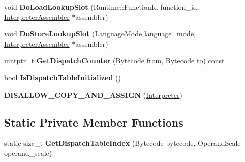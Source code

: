 \begin{DoxyCompactItemize}
\item 
void {\bfseries Do\+Load\+Lookup\+Slot} (Runtime\+::\+Function\+Id function\+\_\+id, \hyperlink{classv8_1_1internal_1_1interpreter_1_1_interpreter_assembler}{Interpreter\+Assembler} $\ast$assembler)\hypertarget{classv8_1_1internal_1_1interpreter_1_1_interpreter_a2507553761cf3a446698a69b08c2d8e2}{}\label{classv8_1_1internal_1_1interpreter_1_1_interpreter_a2507553761cf3a446698a69b08c2d8e2}

\item 
void {\bfseries Do\+Store\+Lookup\+Slot} (Language\+Mode language\+\_\+mode, \hyperlink{classv8_1_1internal_1_1interpreter_1_1_interpreter_assembler}{Interpreter\+Assembler} $\ast$assembler)\hypertarget{classv8_1_1internal_1_1interpreter_1_1_interpreter_af36c8407324e95afa04442dcb1fddff8}{}\label{classv8_1_1internal_1_1interpreter_1_1_interpreter_af36c8407324e95afa04442dcb1fddff8}

\item 
uintptr\+\_\+t {\bfseries Get\+Dispatch\+Counter} (Bytecode from, Bytecode to) const \hypertarget{classv8_1_1internal_1_1interpreter_1_1_interpreter_ab2ae4fb0effb32b50e433229001080d7}{}\label{classv8_1_1internal_1_1interpreter_1_1_interpreter_ab2ae4fb0effb32b50e433229001080d7}

\item 
bool {\bfseries Is\+Dispatch\+Table\+Initialized} ()\hypertarget{classv8_1_1internal_1_1interpreter_1_1_interpreter_af489bf102bafa981f5587f5816f2ec37}{}\label{classv8_1_1internal_1_1interpreter_1_1_interpreter_af489bf102bafa981f5587f5816f2ec37}

\item 
{\bfseries D\+I\+S\+A\+L\+L\+O\+W\+\_\+\+C\+O\+P\+Y\+\_\+\+A\+N\+D\+\_\+\+A\+S\+S\+I\+GN} (\hyperlink{classv8_1_1internal_1_1interpreter_1_1_interpreter}{Interpreter})\hypertarget{classv8_1_1internal_1_1interpreter_1_1_interpreter_a554a9f2a0c2fdd8705dc37c91ad6a217}{}\label{classv8_1_1internal_1_1interpreter_1_1_interpreter_a554a9f2a0c2fdd8705dc37c91ad6a217}

\end{DoxyCompactItemize}
\subsection*{Static Private Member Functions}
\begin{DoxyCompactItemize}
\item 
static size\+\_\+t {\bfseries Get\+Dispatch\+Table\+Index} (Bytecode bytecode, Operand\+Scale operand\+\_\+scale)\hypertarget{classv8_1_1internal_1_1interpreter_1_1_interpreter_a497c5159ea1055eb7341cececc072cee}{}\label{classv8_1_1internal_1_1interpreter_1_1_interpreter_a497c5159ea1055eb7341cececc072cee}

\end{DoxyCompactItemize}
